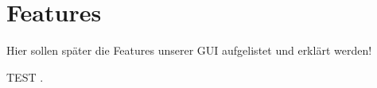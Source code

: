 \documentclass[a4paper, 11pt]{article} %
\begin{document}
\section{Features} %
\label{sec:features}
Hier sollen später die Features unserer GUI aufgelistet und erklärt werden!

TEST \cite{dummy:svs}.





\end{document}
